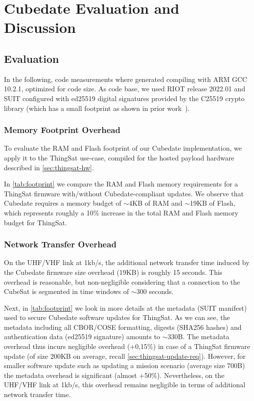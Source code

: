 \section{Cubedate Evaluation and Discussion}
\label{sec:evaluation}

\subsection{Evaluation}

In the following, code measurements where generated compiling with ARM GCC 10.2.1,
optimized for code size. As code base, we used RIOT release 2022.01 and SUIT configured
with ed25519 digital signatures provided by the C25519 crypto library (which has a small
footprint as shown in prior work~\cite{zandberg2019secure}).

\subsubsection{Memory Footprint Overhead}

To evaluate the RAM and Flash footprint of our Cubedate implementation, we apply it to
the ThingSat use-case, compiled for the hosted payload hardware described in \autoref{sec:thingsat-hw}.

In \autoref{tab:footprint} we compare the RAM and Flash memory requirements for a ThingSat firmware with/without Cubedate-compliant updates.
We observe that Cubedate requires a memory budget of $\sim$4KB of RAM and $\sim$19KB of Flash, which represents roughly a 10\%
increase in the total RAM and Flash memory budget for ThingSat.

\subsubsection{Network Transfer Overhead}
On the UHF/VHF link at 1kb/s, the additional network transfer time induced by the Cubedate firmware size overhead (19KB) is roughly 15 seconds.
This overhead is reasonable, but non-negligible considering that a connection to the CubeSat is segmented in time windows of $\sim$300 seconds.

Next, in \autoref{tab:footprint} we look in more details at the metadata (SUIT manifest) used to secure Cubedate software updates for ThingSat.
As we can see, the metadata including all CBOR/COSE formatting, digests (SHA256 hashes) and authentication data (ed25519 signature) amounts to $\sim$330B.
The metadata overhead thus incurs negligible overhead (+0,15\%) in case of a ThingSat firmware update (of size 200KB on average, recall
\autoref{sec:thingsat-update-req}). However, for smaller software update such as updating a mission scenario (average size 700B) the metadata
overhead is significant (almost +50\%). Nevertheless, on the UHF/VHF link at 1kb/s, this overhead remains negligible in terms of additional
network transfer time.

